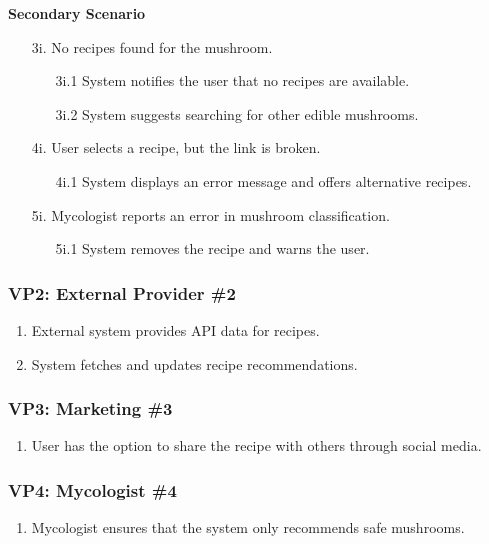 \documentclass[]{article}
\begin{document}
\begin{enumerate}[{\bf BE1.}]
\begin{enumerate}[{\bf BE3.}]
\begin{enumerate}[{\bf VP1.}]
		\textbf{Secondary Scenario}
		\begin{enumerate}
			\item[3i.] No recipes found for the mushroom.
			\begin{enumerate}
				\item[3i.1] System notifies the user that no recipes are available.
				\item[3i.2] System suggests searching for other edible mushrooms.
			\end{enumerate}
			\item[4i.] User selects a recipe, but the link is broken.
			\begin{enumerate}
				\item[4i.1] System displays an error message and offers alternative recipes.
			\end{enumerate}
			\item[5i.] Mycologist reports an error in mushroom classification.
			\begin{enumerate}
				\item[5i.1] System removes the recipe and warns the user.
			\end{enumerate}
		\end{enumerate}
		
		\subsubsection*{VP2: External Provider \#2}
		\begin{enumerate}
			\item External system provides API data for recipes.
			\item System fetches and updates recipe recommendations.
		\end{enumerate}
		
		\subsubsection*{VP3: Marketing \#3}
		\begin{enumerate}
			\item User has the option to share the recipe with others through social media.
		\end{enumerate}
		
		\subsubsection*{VP4: Mycologist \#4}
		\begin{enumerate}
			\item Mycologist ensures that the system only recommends safe mushrooms.
		\end{enumerate}
		

\end{enumerate}
\end{enumerate}
\end{enumerate}
\end{document}
